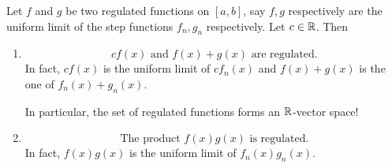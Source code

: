\documentclass[10pt, a4paper]{article}
\begin{document}
\begin{proposition}\label{pre:analy:prop:regulatedcolt}
    Let $f$ and $g$ be two regulated functions on $[a, b]$,
    say $f, g$ respectively are the uniform limit of the step functions $f_n, g_n$ respectively.
    Let $c \in \mathbb{R}$.
    Then
    \begin{enumerate}[label = (\roman*)]
        \item
        \[
        cf(x)\text{ and } f(x) + g(x)\text{ are regulated}.
        \]
        In fact,
        $cf(x)$ is the uniform limit of $cf_n(x)$ and $f(x) + g(x)$ is the one of $f_n(x) + g_n(x)$.
        
        In particular,
        the set of regulated functions forms an $\mathbb{R}$-vector space!
        
        \item
        \[
        \text{The product } f(x)g(x)\text{ is regulated}.
        \]
        In fact,
        $f(x)g(x)$ is the uniform limit of $f_n(x)g_n(x)$.


\end{enumerate}
\end{proposition}
\end{document}
